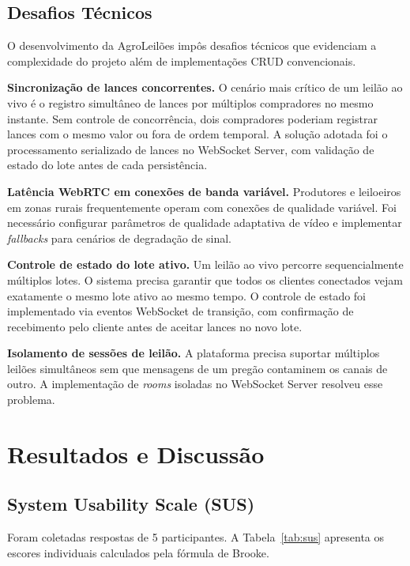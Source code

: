 \documentclass[12pt]{article}
\begin{document}
\subsection{Desafios Técnicos}

O desenvolvimento da AgroLeilões impôs desafios técnicos que evidenciam a complexidade
do projeto além de implementações CRUD convencionais.

\textbf{Sincronização de lances concorrentes.}
O cenário mais crítico de um leilão ao vivo é o registro simultâneo de lances por
múltiplos compradores no mesmo instante. Sem controle de concorrência, dois compradores
poderiam registrar lances com o mesmo valor ou fora de ordem temporal. A solução adotada
foi o processamento serializado de lances no WebSocket Server, com validação de estado
do lote antes de cada persistência.

\textbf{Latência WebRTC em conexões de banda variável.}
Produtores e leiloeiros em zonas rurais frequentemente operam com conexões de qualidade
variável. Foi necessário configurar parâmetros de qualidade adaptativa de vídeo e
implementar \textit{fallbacks} para cenários de degradação de sinal.

\textbf{Controle de estado do lote ativo.}
Um leilão ao vivo percorre sequencialmente múltiplos lotes. O sistema precisa garantir
que todos os clientes conectados vejam exatamente o mesmo lote ativo ao mesmo tempo.
O controle de estado foi implementado via eventos WebSocket de transição, com confirmação
de recebimento pelo cliente antes de aceitar lances no novo lote.

\textbf{Isolamento de sessões de leilão.}
A plataforma precisa suportar múltiplos leilões simultâneos sem que mensagens de um
pregão contaminem os canais de outro. A implementação de \textit{rooms} isoladas no
WebSocket Server resolveu esse problema.

\section{Resultados e Discussão}
\label{sec:resultados}

\subsection{System Usability Scale (SUS)}

Foram coletadas respostas de 5 participantes. A Tabela~\ref{tab:sus} apresenta os
escores individuais calculados pela fórmula de Brooke.
\end{document}
